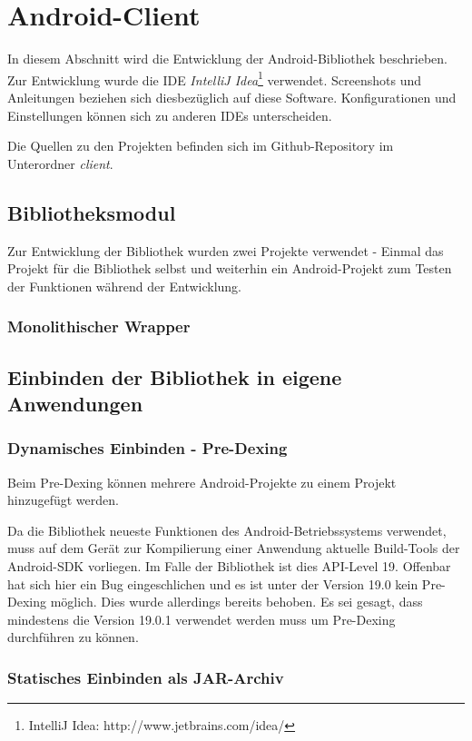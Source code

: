 \section{Android-Client}

In diesem Abschnitt wird die Entwicklung der Android-Bibliothek beschrieben. Zur Entwicklung wurde die IDE \textit{IntelliJ Idea}\footnote{IntelliJ Idea: http://www.jetbrains.com/idea/} verwendet. Screenshots und Anleitungen beziehen sich diesbezüglich auf diese Software. Konfigurationen und Einstellungen können sich zu anderen IDEs unterscheiden. 

Die Quellen zu den Projekten befinden sich im Github-Repository im Unterordner \textit{client}.

\subsection{Bibliotheksmodul}

Zur Entwicklung der Bibliothek wurden zwei Projekte verwendet - Einmal das Projekt für die Bibliothek selbst und weiterhin ein Android-Projekt zum Testen der Funktionen während der Entwicklung. 

\subsubsection{Monolithischer Wrapper}

\subsection{Einbinden der Bibliothek in eigene Anwendungen}

\subsubsection{Dynamisches Einbinden - Pre-Dexing}

Beim Pre-Dexing können mehrere Android-Projekte zu einem Projekt hinzugefügt werden. 

Da die Bibliothek neueste Funktionen des Android-Betriebssystems verwendet, muss auf dem  Gerät zur Kompilierung einer Anwendung aktuelle Build-Tools der Android-SDK vorliegen. Im Falle der Bibliothek ist dies API-Level 19. Offenbar hat sich hier ein Bug eingeschlichen und es ist unter der Version 19.0 kein Pre-Dexing möglich. Dies wurde allerdings bereits behoben. Es sei gesagt, dass mindestens die Version 19.0.1 verwendet werden muss um Pre-Dexing durchführen zu können. 

\subsubsection{Statisches Einbinden als JAR-Archiv}
